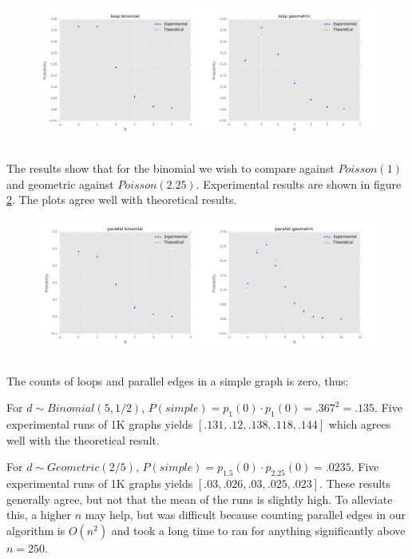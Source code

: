 \documentclass{article}
\begin{document}
\begin{figure}[!ht]
	\centering
	\includegraphics[width=\textwidth]{loop.png}
	\label{loop}
\end{figure}

\subsection{}
\vspace{-2ex}
The results show that for the binomial we wish to compare against $Poisson(1)$ and geometric against $Poisson(2.25)$. Experimental results are shown in figure \ref{parallel}. The plots agree well with theoretical results.

\begin{figure}[!ht]
	\centering
	\includegraphics[width=\textwidth]{parallel.png}
	\label{parallel}
\end{figure}

\subsection{}
\vspace{-2ex}
The counts of loops and parallel edges in a simple graph is zero, thus:

For $d\sim Binomial(5,1/2)$, $P(simple)=p_1(0)\cdot p_1(0)=.367^2=.135$. Five experimental runs of 1K graphs yields $[.131,.12,.138,.118,.144]$ which agrees well with the theoretical result.

For $d\sim Geometric(2/5)$, $P(simple)=p_{1.5}(0)\cdot p_{2.25}(0)=.0235$. Five experimental runs of 1K graphs yields $[.03,.026,.03, .025, .023]$. These results generally agree, but not that the mean of the runs is slightly high. To alleviate this, a higher $n$ may help, but was difficult because counting parallel edges in our algorithm is $O(n^2)$ and took a long time to ran for anything significantly above $n=250$.
\end{document}
